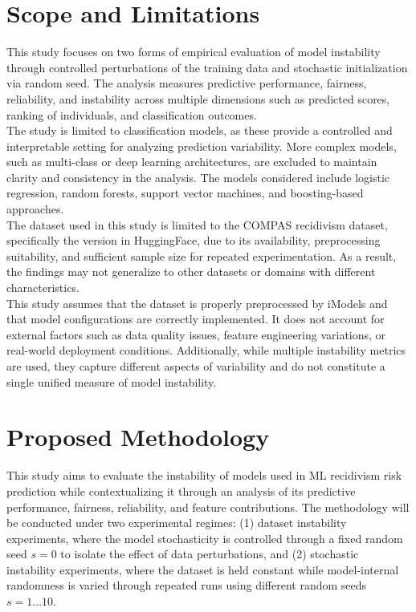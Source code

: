 \documentclass[12pt]{article}
\begin{document}
\section{Scope and Limitations} 
\tab This study focuses on two forms of empirical evaluation of model instability through controlled perturbations of the training data and stochastic initialization via random seed. The analysis measures predictive performance, fairness, reliability, and instability across multiple dimensions such as predicted scores, ranking of individuals, and classification outcomes.\\

The study is limited to classification models, as these provide a controlled and interpretable setting for analyzing prediction variability. More complex models, such as multi-class or deep learning architectures, are excluded to maintain clarity and consistency in the analysis. The models considered include logistic regression, random forests, support vector machines, and boosting-based approaches.\\

The dataset used in this study is limited to the COMPAS recidivism dataset, specifically the version in HuggingFace, due to its availability, preprocessing suitability, and sufficient sample size for repeated experimentation. As a result, the findings may not generalize to other datasets or domains with different characteristics.\\

This study assumes that the dataset is properly preprocessed by iModels and that model configurations are correctly implemented. It does not account for external factors such as data quality issues, feature engineering variations, or real-world deployment conditions. Additionally, while multiple instability metrics are used, they capture different aspects of variability and do not constitute a single unified measure of model instability.

\section{Proposed Methodology}
\tab This study aims to evaluate the instability of models used in ML recidivism risk prediction while contextualizing it through an analysis of its predictive performance, fairness, reliability, and feature contributions. The methodology will be conducted under two experimental regimes: (1) dataset instability experiments, where the model stochasticity is controlled through a fixed random seed $s = 0 $ to isolate the effect of data perturbations, and (2) stochastic instability experiments, where the dataset is held constant while model-internal randomness is varied through repeated runs using different random seeds  $ s = 1 ... 10 $. \\
\end{document}
